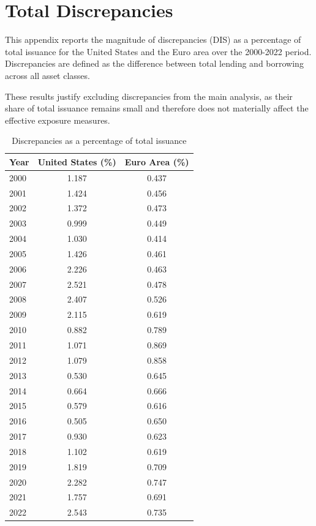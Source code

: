 \chapter{Total Discrepancies}
\label{Appendix B:Total_dis}

This appendix reports the magnitude of discrepancies (DIS) as a percentage of total
issuance for the United States and the Euro area over the 2000-2022 period.
Discrepancies are defined as the difference between total lending and borrowing
across all asset classes.

These results justify excluding discrepancies from the main analysis, as their
share of total issuance remains small and therefore does not materially affect
the effective exposure measures.

\vspace{5pt}

\begin{table}[h]
\centering
\caption{Discrepancies as a percentage of total issuance}
\label{tab:dis_us_eu}
\begin{tabular}{lcc}
\toprule
Year & United States (\%) & Euro Area (\%) \\
\midrule
2000 & 1.187 & 0.437 \\
2001 & 1.424 & 0.456 \\
2002 & 1.372 & 0.473 \\
2003 & 0.999 & 0.449 \\
2004 & 1.030 & 0.414 \\
2005 & 1.426 & 0.461 \\
2006 & 2.226 & 0.463 \\
2007 & 2.521 & 0.478 \\
2008 & 2.407 & 0.526 \\
2009 & 2.115 & 0.619 \\
2010 & 0.882 & 0.789 \\
2011 & 1.071 & 0.869 \\
2012 & 1.079 & 0.858 \\
2013 & 0.530 & 0.645 \\
2014 & 0.664 & 0.666 \\
2015 & 0.579 & 0.616 \\
2016 & 0.505 & 0.650 \\
2017 & 0.930 & 0.623 \\
2018 & 1.102 & 0.619 \\
2019 & 1.819 & 0.709 \\
2020 & 2.282 & 0.747 \\
2021 & 1.757 & 0.691 \\
2022 & 2.543 & 0.735 \\
\bottomrule
\end{tabular}
\end{table}